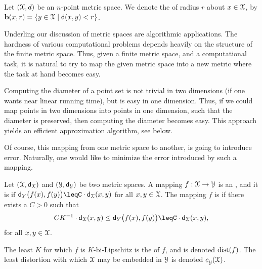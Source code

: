 \begin{defn}
    Let $(\FMS,d)$ be an $n$-point metric space. We denote the
     of radius $r$ about $x \in \FMS$, by
    $\Ball(x,r) = \Set{ y \in \FMS }{ \dY{x}{y} < r }$.
\end{defn}

Underling our discussion of metric spaces are algorithmic
applications. The hardness of various computational problems depends
heavily on the structure of the finite metric space. Thus, given a
finite metric space, and a computational task, it is natural to try to
map the given metric space into a new metric where the task at hand
becomes easy.

\begin{example}
    Computing the diameter of a point set is not trivial in two
    dimensions (if one wants near linear running time), but is easy in
    one dimension. Thus, if we could map points in two dimensions into
    points in one dimension, such that the diameter is preserved, then
    computing the diameter becomes easy. This approach yields an
    efficient approximation algorithm, see  below.
\end{example}

Of course, this mapping from one metric space to another, is going to
introduce error.  Naturally, one would like to minimize the error
introduced by such a mapping.
\begin{defn}
    Let $(\FMS,\DistChar_\FMS)$ and $(\FMSB,\DistChar_\FMSB)$ be two
    metric spaces. A mapping $f:\FMS \to \FMSB$ is an
    , and it is  if
    \begin{math}
        \DistChar_Y\bigl(f(x),f(y) \bigr)%
        \leq%
        C \cdot \DistChar_\FMS(x,y)
    \end{math}
    for all $x,y\in \FMS$.  The mapping $f$ is
     if there exists a $C > 0$ such that
    \begin{equation*}
        CK^{-1} \cdot \DistChar_\FMS(x,y)%
        \leq%
        \DistChar_Y\bigl(f(x),f(y)\bigr)%
        \leq%
        C\cdot
        \DistChar_\FMS(x,y),
    \end{equation*}
    for all $x,y\in \FMS$.
    
    The least $K$ for which $f$ is $K$-bi-Lipschitz is the
     of $f$, and is denoted $\mathrm{dist}(f)$. The least
    distortion with which $\FMS$ may be embedded in $\FMSB$ is denoted
    $c^{}_\FMSB(\FMS)$.  
     
\end{defn}

